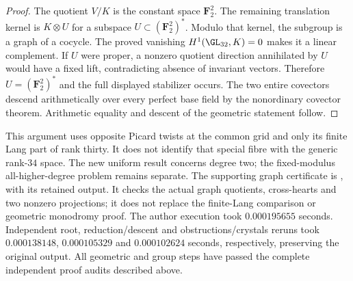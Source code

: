 \begin{proof}
The quotient $V/K$ is the constant space $\mathbf F_2^2$.
The remaining translation kernel is $K\otimes U$ for a
subspace $U\subset(\mathbf F_2^2)^*$. Modulo that kernel,
the subgroup is a graph of a cocycle. The proved vanishing
$H^1(\GL_{32},K)=0$ makes it a linear complement. If $U$
were proper, a nonzero quotient direction annihilated by
$U$ would have a fixed lift, contradicting absence of
invariant vectors. Therefore $U=(\mathbf F_2^2)^*$ and
the full displayed stabilizer occurs. The two entire
covectors descend arithmetically over every perfect base
field by the nonordinary covector theorem. Arithmetic
equality and descent of the geometric statement follow.
\end{proof}

\begin{remark}
\label{rem:mixed-degree-two-wreath-grid-scope-candidate}
This argument uses opposite Picard twists at the common grid
and only its finite Lang part of rank thirty. It does not
identify that special fibre with the generic rank-$34$ space.
The new uniform result concerns degree two; the fixed-modulus
all-higher-degree problem remains separate. The supporting graph
certificate is
,
with its retained output. It checks the actual graph quotients,
cross-hearts and two nonzero projections; it does not replace
the finite-Lang comparison or geometric monodromy proof.
The author execution took $0.000195655$ seconds. Independent
root, reduction/descent and obstructions/crystals reruns took
$0.000138148$, $0.000105329$ and $0.000102624$ seconds,
respectively, preserving the original output. All geometric and
group steps have passed the complete
independent proof audits described above.
\end{remark}
